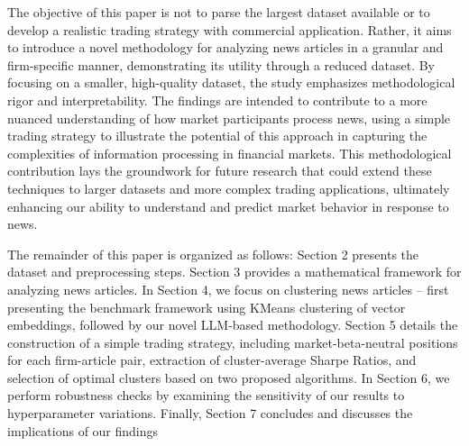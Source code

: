 \mx 
The objective of this paper is not to parse the largest dataset available or to develop a realistic trading strategy with commercial application. Rather, it aims to introduce a novel methodology for analyzing news articles in a granular and firm-specific manner, demonstrating its utility through a reduced dataset. By focusing on a smaller, high-quality dataset, the study emphasizes methodological rigor and interpretability. The findings are intended to contribute to a more nuanced understanding of how market participants process news, using a simple trading strategy to illustrate the potential of this approach in capturing the complexities of information processing in financial markets. This methodological contribution lays the groundwork for future research that could extend these techniques to larger datasets and more complex trading applications, ultimately enhancing our ability to understand and predict market behavior in response to news.

\mx 
The remainder of this paper is organized as follows: Section 2 presents the dataset and preprocessing steps. Section 3 provides a mathematical framework for analyzing news articles. In Section 4, we focus on clustering news articles -- first presenting the benchmark framework using KMeans clustering of vector embeddings, followed by our novel LLM-based methodology. Section 5 details the construction of a simple trading strategy, including market-beta-neutral positions for each firm-article pair, extraction of cluster-average Sharpe Ratios, and selection of optimal clusters based on two proposed algorithms. In Section 6, we perform robustness checks by examining the sensitivity of our results to hyperparameter variations. Finally, Section 7 concludes and discusses the implications of our findings